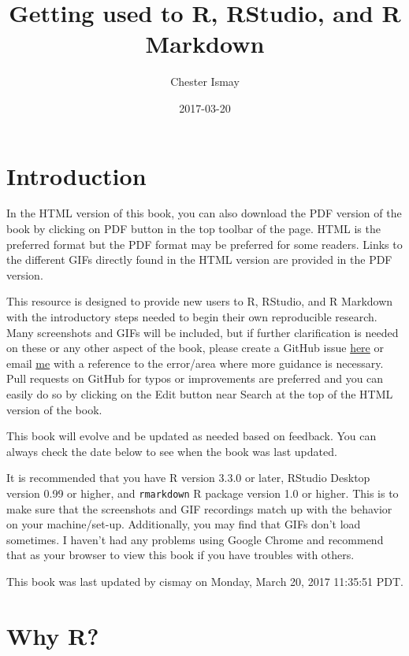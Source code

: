 \documentclass[]{tufte-book}
\title{Getting used to R, RStudio, and R Markdown}
\author{Chester Ismay}
\date{2017-03-20}
\theoremstyle{definition}
\theoremstyle{definition}
\theoremstyle{remark}
\begin{document}
\maketitle



{
\setcounter{tocdepth}{1}
\tableofcontents
}

\chapter{Introduction}\label{intro}

In the HTML version of this book, you can also download the PDF version
of the book by clicking on PDF button in the top toolbar of the page.
HTML is the preferred format but the PDF format may be preferred for
some readers. Links to the different GIFs directly found in the HTML
version are provided in the PDF version.

This resource is designed to provide new users to R, RStudio, and R
Markdown with the introductory steps needed to begin their own
reproducible research. Many screenshots and GIFs will be included, but
if further clarification is needed on these or any other aspect of the
book, please create a GitHub issue
\href{https://github.com/ismayc/rbasics-book/issues}{here} or email
\href{mailto:chester.ismay@gmail.com}{me} with a reference to the
error/area where more guidance is necessary. Pull requests on GitHub for
typos or improvements are preferred and you can easily do so by clicking
on the Edit button near Search at the top of the HTML version of the
book.

This book will evolve and be updated as needed based on feedback. You
can always check the date below to see when the book was last updated.

It is recommended that you have R version 3.3.0 or later, RStudio
Desktop version 0.99 or higher, and \texttt{rmarkdown} R package version
1.0 or higher. This is to make sure that the screenshots and GIF
recordings match up with the behavior on your machine/set-up.
Additionally, you may find that GIFs don't load sometimes. I haven't had
any problems using Google Chrome and recommend that as your browser to
view this book if you have troubles with others.

This book was last updated by cismay on Monday, March 20, 2017 11:35:51
PDT.

\chapter{Why R?}\label{whyR}
\end{document}
